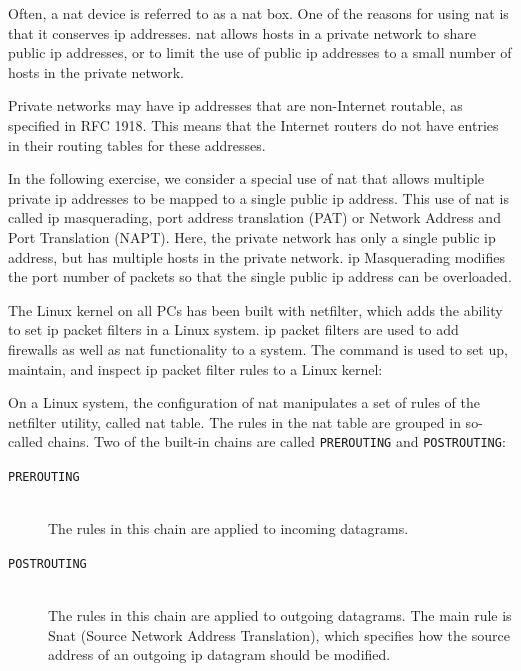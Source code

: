 Often, a \ac{nat} device is referred to as a \ac{nat} box. One of the reasons for using \ac{nat} is that it conserves \acs{ip} addresses. \ac{nat} allows hosts in a private network to share public \acs{ip} addresses, or to limit the use of public \acs{ip} addresses to a small number of hosts in the private network.

Private networks may have \acs{ip} addresses that are non-Internet routable, as specified in RFC 1918. This means that the Internet routers do not have entries in their routing tables for these addresses.

In the following exercise, we consider a special use of \ac{nat} that allows multiple private \acs{ip} addresses to be mapped to a single public \acs{ip} address. This use of \ac{nat} is called \acs{ip} masquerading, port address translation (PAT) or Network Address and Port Translation (NAPT). Here, the private network has only a single public \acs{ip} address, but has multiple hosts in the private network. \acs{ip} Masquerading modifies the port number of packets so that the single public \acs{ip} address can be overloaded.

The Linux kernel on all PCs has been built with netfilter, which adds the ability to set \acs{ip} packet filters in a Linux system. \acs{ip} packet filters are used to add firewalls as well as \ac{nat} functionality to a system. The  command is used to set up, maintain, and inspect \acs{ip} packet filter rules to a Linux kernel:

On a Linux system, the configuration of \ac{nat} manipulates a set of rules of the netfilter utility, called \ac{nat} table. The rules in the \ac{nat} table are grouped in so- called chains. Two of the built-in chains are called \texttt{PREROUTING} and \texttt{POSTROUTING}:
\begin{framed}
\begin{description}
	\item[\texttt{PREROUTING}] \hfill \\
		The rules in this chain are applied to incoming datagrams.
	\item[\texttt{POSTROUTING}] \hfill \\
		The rules in this chain are applied to outgoing datagrams. The main rule is S\ac{nat} (Source Network Address Translation), which specifies how the source address of an outgoing \acs{ip} datagram should be modified.
\end{description}
\end{framed}

